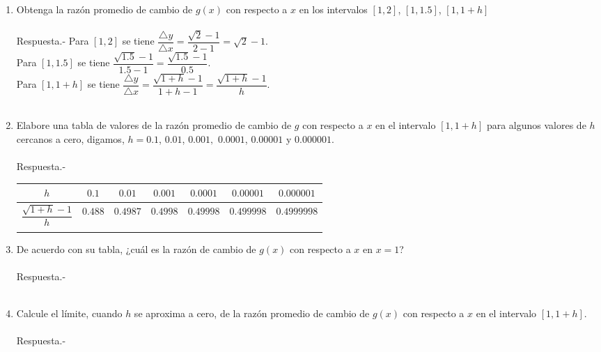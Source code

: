 \begin{enumerate}
\begin{enumerate}[\bfseries a)]
    \item Obtenga la razón promedio de cambio de $g(x)$ con respecto a $x$ en los intervalos $[1,2]$, $[1,1.5]$, $[1,1+h]$\\\\
	Respuesta.-\; Para $[1,2]$  se tiene $\dfrac{\triangle y}{\triangle x} = \dfrac{\sqrt{2} - 1}{2-1} = \sqrt{2}-1$.\\
	Para $[1,1.5]$ se tiene $\dfrac{\sqrt{1.5}-1}{1.5-1} = \dfrac{\sqrt{1.5}-1}{0.5}$.\\
	Para $[1,1+h]$ se tiene $\dfrac{\triangle y}{\triangle x} = \dfrac{\sqrt{1+h}-1}{1+h - 1} = \dfrac{\sqrt{1+h}-1}{h}$.\\\\

    \item Elabore una tabla de valores de la razón promedio de cambio de $g$ con respecto a $x$ en el intervalo $[1, 1 + h]$ para algunos valores de $h$ cercanos a cero, digamos, $h = 0.1$, $0.01$, $0.001,$ $0.0001$, $0.00001$ y $0.000001.$\\\\
	Respuesta.-\; 
	\begin{center}
	    \begin{tabular}{c|c|c|c|c|c|c}
		$h$&$0.1$&$0.01$&$0.001$&$0.0001$&$0.00001$&$0.000001$\\
		\hline
		$\dfrac{\sqrt{1+h}-1}{h}$&$0.488$&$0.4987$&$0.4998$&$0.49998$&$0.499998$&$0.4999998$\\\\
	    \end{tabular}
	\end{center}

    \item De acuerdo con su tabla, ¿cuál es la razón de cambio de $g(x)$ con respecto a $x$ en $x = 1$?\\\\
	Respuesta.-\\\\

    \item Calcule el límite, cuando $h$ se aproxima a cero, de la razón promedio de cambio de $g(x)$ con respecto a $x$ en el intervalo $[1, 1 + h].$\\\\

	Respuesta.-\\\\


\end{enumerate}
\end{enumerate}
